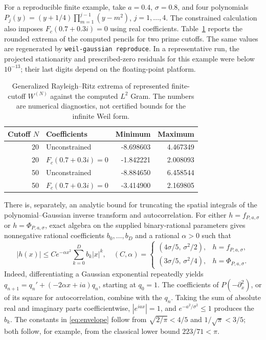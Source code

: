 \documentclass[11pt]{article}
\begin{document}
For a reproducible finite example, take $a=0.4$, $\sigma=0.8$, and four
polynomials
$P_j(y)=(y+1/4)\prod_{m=1}^{j-1}(y-m^2)$, $j=1,\ldots,4$.
The constrained calculation also imposes $F_c(0.7+0.3i)=0$ using real
coefficients. Table~\ref{tab:extremal} reports the rounded extrema of the
computed pencils for two prime cutoffs. The same values are regenerated by
\texttt{weil-gaussian reproduce}. In a representative run, the projected
stationarity and prescribed-zero residuals for this example were below
$10^{-13}$; their last digits depend on the floating-point platform.

\begin{table}[htbp]
\centering
\begin{tabular}{rlrr}
\hline
Cutoff $N$ & Coefficients & Minimum & Maximum\\
\hline
20 & Unconstrained & -8.698603 & 4.467349\\
20 & $F_c(0.7+0.3i)=0$ & -1.842221 & 2.008093\\
50 & Unconstrained & -8.884650 & 6.458544\\
50 & $F_c(0.7+0.3i)=0$ & -3.414900 & 2.169805\\
\hline
\end{tabular}
\caption{Generalized Rayleigh--Ritz extrema of represented finite-cutoff
$W^{(N)}$ against the computed $L^2$ Gram. The numbers are numerical
diagnostics, not certified bounds for the infinite Weil form.}
\label{tab:extremal}
\end{table}

There is, separately, an analytic bound for truncating the spatial
integrals of the polynomial--Gaussian inverse transform and
autocorrelation. For either $h=f_{P,a,\sigma}$ or
$h=\Phi_{P,a,\sigma}$, exact algebra on the supplied binary-rational
parameters gives nonnegative rational coefficients $b_0,\ldots,b_D$ and
a rational $\alpha>0$ such that
\begin{equation}\label{eq:envelope}
  |h(x)|\le C e^{-\alpha x^2}
  \sum_{k=0}^{D}b_k|x|^k,
  \quad
  (C,\alpha)=
  \begin{cases}
    (4\sigma/5,\,\sigma^2/2),&h=f_{P,a,\sigma},\\
    (3\sigma/5,\,\sigma^2/4),&h=\Phi_{P,a,\sigma}.
  \end{cases}
\end{equation}
Indeed, differentiating a Gaussian exponential repeatedly yields
$q_{n+1}=q_n'+(-2\alpha x+ia)q_n$, starting at $q_0=1$.
The coefficients of $P(-\partial_x^2)$, or of its square for
autocorrelation, combine with the $q_n$. Taking the sum of absolute real
and imaginary parts coefficientwise, $|e^{iax}|=1$, and
$e^{-a^2/\sigma^2}\le1$ produces the $b_k$. The constants in
\eqref{eq:envelope} follow from
$\sqrt{2/\pi}<4/5$ and $1/\sqrt\pi<3/5$;
both follow, for example, from the classical lower bound
$223/71<\pi$.
\end{document}
